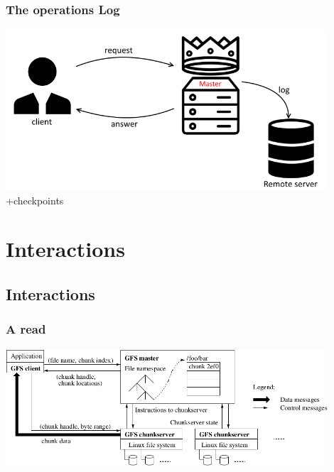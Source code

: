 \documentclass{beamer}
\newcommand{\slidewidth}{12cm}
\begin{document}
\begin{frame}
 \frametitle{The operations Log}
 \begin{center}
 \includegraphics[height=6cm]{figures/logschema.png}
 \alert{+checkpoints}
 \end{center}
\end{frame}

\section{Interactions}
\subsection{Interactions}
\begin{frame}
 \frametitle{A read}
 \centering
 \includegraphics[width=\slidewidth]{figures/GFSarchitecture.png}
\end{frame}
\end{document}
